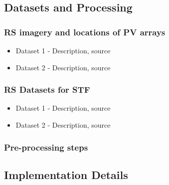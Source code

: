 \begin{multicols}{2}

\subsection{Datasets and Processing}
\subsubsection{RS imagery and locations of PV arrays}
    \begin{itemize}
        \item Dataset 1 - Description, source
        \item Dataset 2 - Description, source
    \end{itemize}
\subsubsection{RS Datasets for STF}
    \begin{itemize}
        \item Dataset 1 - Description, source
        \item Dataset 2 - Description, source
    \end{itemize}
\subsubsection{Pre-processing steps}
    

\subsection{Implementation Details}

\end{multicols}
